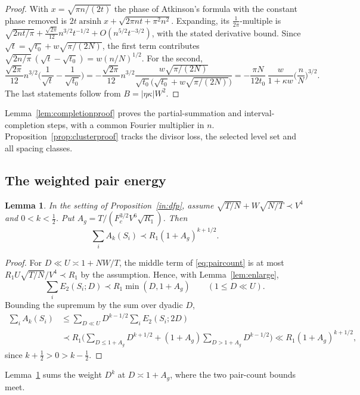 \documentclass[11pt]{amsart}
\newtheorem{lemma}[theorem]{Lemma}
\theoremstyle{definition}
\theoremstyle{remark}
\numberwithin{equation}{section}
\begin{document}
\begin{proof}

With $x=\sqrt{\pi n/(2t)}$ the phase of Atkinson's formula with the constant phase removed is $2t\operatorname{arsinh}x+\sqrt{2\pi nt+\pi^2n^2}$. Expanding, its $\frac1{2\pi}$-multiple is $\sqrt{2nt/\pi}+\frac{\sqrt{2\pi}}{12}n^{3/2}t^{-1/2}+O(n^{5/2}t^{-3/2})$, with the stated derivative bound. Since $\sqrt t=\sqrt{t_0}+w\sqrt{\pi/(2N)}$, the first term contributes $\sqrt{2n/\pi}\,(\sqrt t-\sqrt{t_0})=w(n/N)^{1/2}$. For the second,
\[
\frac{\sqrt{2\pi}}{12}n^{3/2}\Big(\frac1{\sqrt t}-\frac1{\sqrt{t_0}}\Big)
=-\frac{\sqrt{2\pi}}{12}n^{3/2}\frac{w\sqrt{\pi/(2N)}}{\sqrt{t_0}\big(\sqrt{t_0}+w\sqrt{\pi/(2N)}\big)}
=-\frac{\pi N}{12t_0}\,\frac{w}{1+\kappa w}\Big(\frac nN\Big)^{3/2}.
\]
The last statements follow from $B=|\eta\kappa|W^2$.
\end{proof}

Lemma~\ref{lem:completionproof} proves the partial-summation and interval-completion steps, with a common Fourier multiplier in $n$. Proposition~\ref{prop:clusterproof} tracks the divisor loss, the selected level set and all spacing classes.

\subsection{The weighted pair energy}

\begin{lemma}\label{lem:weighted}
In the setting of Proposition~\ref{in:dfp}, assume $\sqrt{T/N}+W\sqrt{N/T}\prec V^4$ and $0<k<\frac12$. Put $A_g=T/(F_c^{3/2}V^6\sqrt{R_1})$. Then
\[
\sum_iA_k(S_i)\prec R_1(1+A_g)^{k+1/2}.
\]
\end{lemma}

\begin{proof}
For $D\ll U\asymp1+NW/T$, the middle term of \eqref{eq:paircount} is at most $R_1U\sqrt{T/N}/V^4\prec R_1$ by the assumption. Hence, with Lemma~\ref{lem:enlarge},
\[
\sum_iE_2(S_i;D)\prec R_1\min(D,1+A_g)\qquad(1\le D\ll U).
\]
Bounding the supremum by the sum over dyadic $D$,
\begin{align*}
\sum_iA_k(S_i)&\le\sum_{D\ll U}D^{k-1/2}\sum_iE_2(S_i;2D)\\
&\prec R_1\Big(\sum_{D\le1+A_g}D^{k+1/2}+(1+A_g)\sum_{D>1+A_g}D^{k-1/2}\Big)\ll R_1(1+A_g)^{k+1/2},
\end{align*}
since $k+\frac12>0>k-\frac12$.
\end{proof}

Lemma~\ref{lem:weighted} sums the weight $D^k$ at $D\asymp1+A_g$, where the two pair-count bounds meet.
\end{document}
